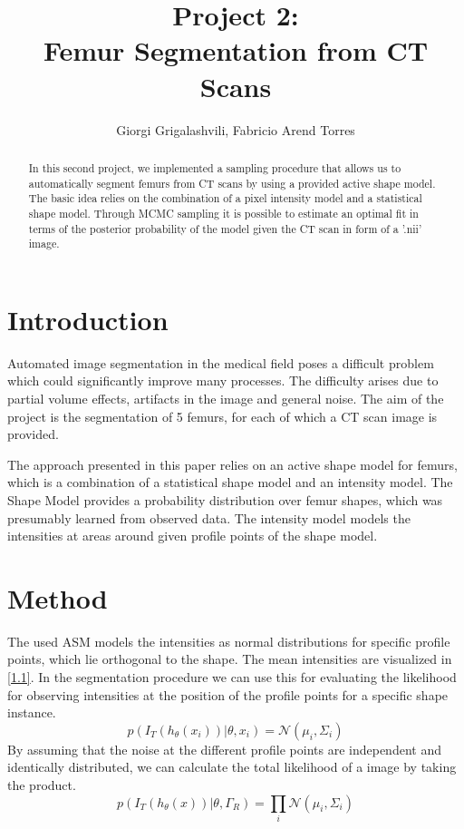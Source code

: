 \documentclass{article}
\begin{document}
	\author{Giorgi Grigalashvili, Fabricio Arend Torres}
		\title{Project 2:\\ Femur Segmentation from CT Scans}
	\maketitle
	\begin{abstract}
		In this second project, we implemented a sampling procedure that allows us to automatically segment femurs from CT scans by using a provided active shape model.
		The basic idea relies on the combination of a pixel intensity model and a statistical shape model.
		Through MCMC sampling it is possible to estimate an optimal fit in terms of the posterior probability of the model given the CT scan in form of a '.nii' image.
	\end{abstract}
	

	\section{Introduction}
	Automated image segmentation in the medical field poses a difficult problem which could significantly improve many processes.
	The difficulty arises due to partial volume effects, artifacts in the image and general noise.
	The aim of the project is the segmentation of 5 femurs, for each of which a CT scan image is provided. 
		
	The approach presented in this paper relies on an active shape model for femurs, which is a combination of a statistical shape model and an intensity model.
	The Shape Model provides a probability distribution over femur shapes, which was presumably learned from observed data.
	The intensity model models the intensities at areas around given profile points of the shape model.	


	\section{Method}
	The used ASM models the intensities as normal distributions for specific profile points, which lie orthogonal to the shape.
	The mean intensities are visualized in \autoref{1.1}.
	In the segmentation procedure we can use this for evaluating the likelihood for observing intensities at the position of the profile points for a specific shape instance.
	\begin{equation}
	p(I_T (h_\theta (x_i)) | \theta,x_i ) = \mathcal{N}(\mu_i, \Sigma_i) 
	\end{equation}
	By assuming that the noise at the different profile points are independent and identically distributed, we can calculate the total likelihood of a image by taking the product.
	\begin{equation}
	p(I_T(h_\theta (x))|\theta, \Gamma_R) = \prod_{i} \mathcal{N}(\mu_i, \Sigma_i)
	\end{equation}
	
\end{document}
